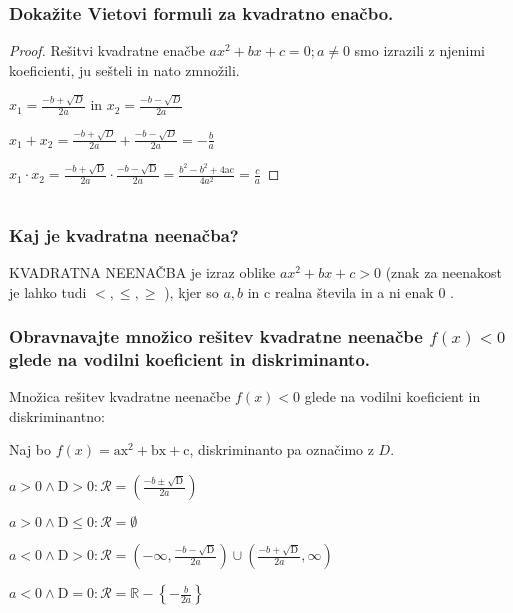 \documentclass{article}
\begin{document}
\subsubsection*{Dokažite Vietovi formuli za kvadratno enačbo.}

\begin{proof}
    Rešitvi kvadratne enačbe $a x^{2}+b x+c=0 ; a \neq 0$ smo izrazili z njenimi koeficienti, ju sešteli in nato zmnožili.

$x_{1}=\frac{-b+\sqrt{D}}{2 a}$ in $x_{2}=\frac{-b-\sqrt{D}}{2 a}$

$x_{1}+x_{2}=\frac{-b+\sqrt{D}}{2 a}+\frac{-b-\sqrt{D}}{2 a}=-\frac{b}{a}$

$x_{1} \cdot x_{2}=\frac{-b+\sqrt{\mathrm{D}}}{2 a} \cdot \frac{-b-\sqrt{\mathrm{D}}}{2 a}=\frac{b^{2}-b^{2}+4 \mathrm{ac}}{4 a^{2}}=\frac{c}{a}$
\end{proof}
\section{\texorpdfstring{}{Kvadratna neenačba}}
\subsubsection*{Kaj je kvadratna neenačba?}

KVADRATNA NEENAČBA je izraz oblike $a x^{2}+b x+c>0$ (znak za neenakost je lahko tudi $<, \leq, \geq$ ), kjer so $a, b$ in c realna števila in a ni enak 0 .

\subsubsection*{Obravnavajte množico rešitev kvadratne neenačbe $f(x)<0$ glede na vodilni koeficient in diskriminanto.}

Množica rešitev kvadratne neenačbe $f(x)<0$ glede na vodilni koeficient in diskriminantno:

Naj bo $f(x)=\mathrm{ax}^{2}+\mathrm{bx}+\mathrm{c}$, diskriminanto pa označimo z $D$.

$a>0 \wedge \mathrm{D}>0: \mathcal{R}=\left(\frac{-b \pm \sqrt{\mathrm{D}}}{2 a}\right)$

$a>0 \wedge \mathrm{D} \leq 0: \mathcal{R}=\emptyset$

$a<0 \wedge \mathrm{D}>0: \mathcal{R}=\left(-\infty, \frac{-b-\sqrt{\mathrm{D}}}{2 a}\right) \cup\left(\frac{-b+\sqrt{\mathrm{D}}}{2 a}, \infty\right)$

$a<0 \wedge \mathrm{D}=0: \mathcal{R}=\mathbb{R}-\left\{-\frac{b}{2 a}\right\}$
\end{document}
